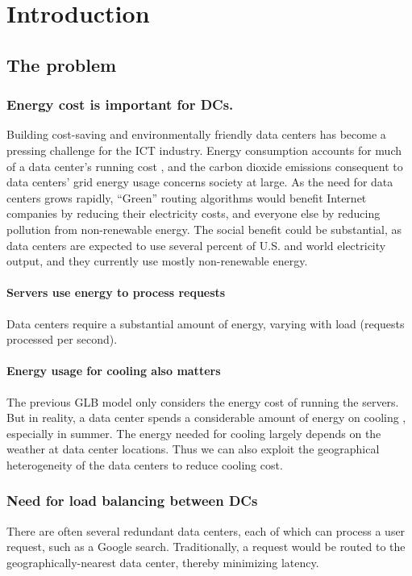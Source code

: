 \documentclass{acm_proc_article-sp}
\begin{document}
\section{Introduction}


\subsection{The problem}
	\subsubsection{Energy cost is important for DCs.}
		Building cost-saving and environmentally friendly data centers has become a pressing challenge for the ICT industry.
		Energy consumption accounts for much of a data center’s running cost \cite{datacenter}, and the carbon dioxide emissions consequent to data centers’ grid energy usage concerns society at large.
		As the need for data centers grows rapidly,
		“Green” routing algorithms would benefit Internet companies by reducing their electricity costs, and everyone else by reducing pollution from non-renewable energy. The social benefit could be substantial, as data centers are expected to use several percent of U.S. and world electricity output, and they currently use mostly non-renewable energy.
		
		\paragraph{Servers use energy to process requests}
			Data centers require a substantial amount of energy, varying with load (requests processed per second).
		\paragraph{Energy usage for cooling also matters}
			The previous GLB model only considers the energy cost of running the servers. But in reality, a data center spends a considerable amount of energy on cooling \cite{datacenter}, especially in summer. The energy needed for cooling largely depends on the weather at data center locations. Thus we can also exploit the geographical heterogeneity of the data centers to reduce cooling cost.
	\subsubsection{Need for load balancing between DCs}
		There are often several redundant data centers, each of which can process a user request, such as a Google search. Traditionally, a request would be routed to the geographically-nearest data center, thereby minimizing latency.
\end{document}
